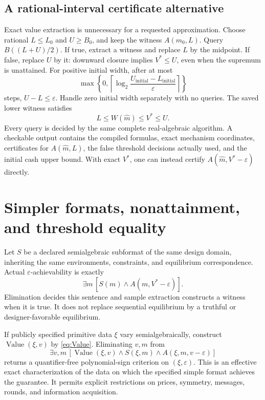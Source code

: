 \documentclass[11pt,a4paper]{article}
\numberwithin{equation}{section}
\theoremstyle{definition}
\DeclareMathOperator{\Val}{Value}
\begin{document}
\subsection{A rational-interval certificate alternative}
Exact value extraction is unnecessary for a requested approximation.
Choose rational \(L\le L_0\) and \(U\ge B_0\), and keep the witness
\(A(m_0,L)\).
Query \(B((L+U)/2)\). If true, extract a witness and replace \(L\)
by the midpoint. If false, replace \(U\) by it: downward closure
implies \(V^*\le U\), even when the supremum is unattained.
For positive initial width, after at most
\begin{equation}\label{eq:bisection}
 \max\left\{0,
   \left\lceil\log_2\frac{U_{\mathrm{initial}}-L_{\mathrm{initial}}}
                            {\varepsilon}\right\rceil\right\}
\end{equation}
steps, \(U-L\le\varepsilon\).
Handle zero initial width separately with no queries.
The saved lower witness satisfies
\[
 L\le W(\widehat m)\le V^*\le U.
\]
Every query is decided by the same complete real-algebraic algorithm.
A checkable output contains the compiled formulas, exact mechanism
coordinates, certificates for \(A(\widehat m,L)\), the false threshold
decisions actually used, and the initial cash upper bound.
With exact \(V^*\), one can instead certify
\(A(\widehat m,V^*-\varepsilon)\) directly.

\section{Simpler formats, nonattainment, and threshold equality}\label{sec:simple}
Let \(S\) be a declared semialgebraic subformat of the same design
domain, inheriting the same environments, constraints, and equilibrium
correspondence. Actual \(\varepsilon\)-achievability is exactly
\begin{equation}\label{eq:simple}
 \exists m\,[S(m)\wedge A(m,V^*-\varepsilon)].
\end{equation}
Elimination decides this sentence and sample extraction constructs
a witness when it is true.
It does not replace sequential equilibrium by a truthful or
designer-favorable equilibrium.

If publicly specified primitive data \(\xi\) vary semialgebraically,
construct \(\Val(\xi,v)\) by \eqref{eq:Value}.
Eliminating \(v,m\) from
\[
 \exists v,m\,[\Val(\xi,v)\wedge S(\xi,m)
                    \wedge A(\xi,m,v-\varepsilon)]
\]
returns a quantifier-free polynomial-sign criterion on
\((\xi,\varepsilon)\).
This is an effective exact characterization of the data on which
the specified simple format achieves the guarantee.
It permits explicit restrictions on prices, symmetry, messages,
rounds, and information acquisition.
\end{document}
